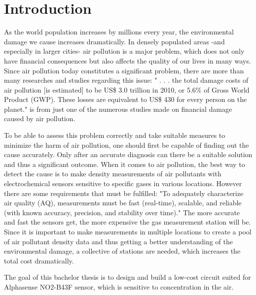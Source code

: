 \chapter{Introduction}
\label{sec:introduction}


As the world population increases by millions every year, the environmental damage we cause increases dramatically. In densely populated areas -and especially in larger cities- air pollution is a major problem, which does not only have financial consequences but also affects the quality of our lives in many ways. Since air pollution today constitutes a significant problem, there are more than many researches and studies regarding this issue: " . . . the total damage costs of air pollution [is estimated] to be US\$ 3.0 trillion in 2010, or 5.6\% of Gross World Product (GWP). These losses are equivalent to US\$ 430 for every person on the planet."\cite{Hutton2011} is from just one of the numerous studies made on financial damage caused by air pollution.\par
To be able to assess this problem correctly and take suitable measures to minimize the harm of air pollution, one should first be capable of finding out the cause accurately. Only after an accurate diagnosis can there be a suitable solution and thus a significant outcome. When it comes to air pollution, the best way to detect the cause is to make density measurements of air pollutants with electrochemical sensors sensitive to specific gases in various locations. However there are some requirements that must be fulfilled: "To adequately characterize air quality (AQ), measurements must be fast (real-time), scalable, and reliable (with known accuracy, precision, and stability over time)."\cite{Cross2017} The more accurate and fast the sensors get, the more expensive the gas measurement station will be. Since it is important to make measurements in multiple locations to create a pool of air pollutant density data and thus getting a better understanding of the environmental damage, a collective of stations are needed, which increases the total cost dramatically.\par
The goal of this bachelor thesis is to design and build a low-cost circuit suited for Alphasense NO2-B43F sensor, which is sensitive to  concentration in the air.



